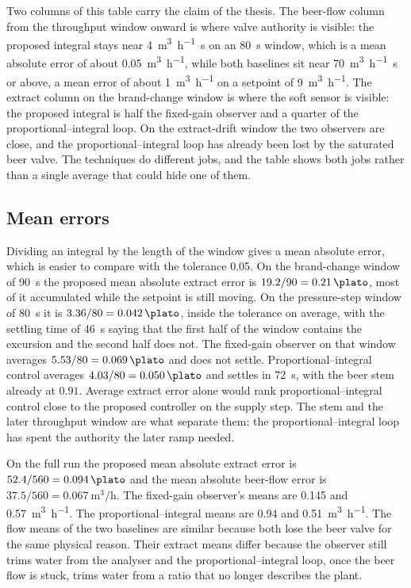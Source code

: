 Two columns of this table carry the claim of the thesis. The beer-flow column from the throughput window onward is where valve authority is visible: the proposed integral stays near \SI{4}{\cubic\metre\per\hour\second} on an \SI{80}{s} window, which is a mean absolute error of about \SI{0.05}{\cubic\metre\per\hour}, while both baselines sit near \SI{70}{\cubic\metre\per\hour\second} or above, a mean error of about \SI{1}{\cubic\metre\per\hour} on a setpoint of \SI{9}{\cubic\metre\per\hour}. The extract column on the brand-change window is where the soft sensor is visible: the proposed integral is half the fixed-gain observer and a quarter of the proportional--integral loop. On the extract-drift window the two observers are close, and the proportional--integral loop has already been lost by the saturated beer valve. The techniques do different jobs, and the table shows both jobs rather than a single average that could hide one of them.

\subsection{Mean errors}

Dividing an integral by the length of the window gives a mean absolute error, which is easier to compare with the tolerance \SI{0.05}{\plato}. On the brand-change window of \SI{90}{s} the proposed mean absolute extract error is $19.2/90 = \SI{0.21}{\plato}$, most of it accumulated while the setpoint is still moving. On the pressure-step window of \SI{80}{s} it is $3.36/80 = \SI{0.042}{\plato}$, inside the tolerance on average, with the settling time of \SI{46}{s} saying that the first half of the window contains the excursion and the second half does not. The fixed-gain observer on that window averages $5.53/80 = \SI{0.069}{\plato}$ and does not settle. Proportional--integral control averages $4.03/80 = \SI{0.050}{\plato}$ and settles in \SI{72}{s}, with the beer stem already at $0.91$. Average extract error alone would rank proportional--integral control close to the proposed controller on the supply step. The stem and the later throughput window are what separate them: the proportional--integral loop has spent the authority the later ramp needed.

On the full run the proposed mean absolute extract error is $52.4/560 = \SI{0.094}{\plato}$ and the mean absolute beer-flow error is $37.5/560 = \SI{0.067}{\cubic\metre\per\hour}$. The fixed-gain observer's means are \SI{0.145}{\plato} and \SI{0.57}{\cubic\metre\per\hour}. The proportional--integral means are \SI{0.94}{\plato} and \SI{0.51}{\cubic\metre\per\hour}. The flow means of the two baselines are similar because both lose the beer valve for the same physical reason. Their extract means differ because the observer still trims water from the analyser and the proportional--integral loop, once the beer flow is stuck, trims water from a ratio that no longer describes the plant.

